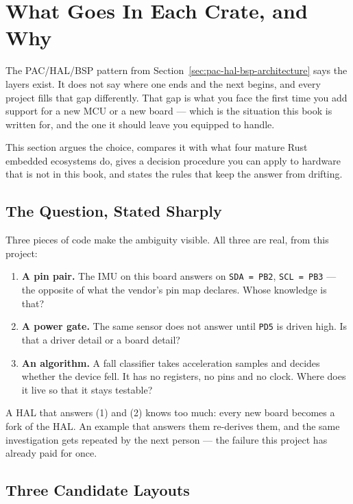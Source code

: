 \section{What Goes In Each Crate, and Why}
\label{sec:what-goes-in-each-crate}

The PAC/HAL/BSP pattern from Section~\ref{sec:pac-hal-bsp-architecture} says the layers exist.
It does not say where one ends and the next begins, and every project fills that gap
differently. That gap is what you face the first time you add support for a new MCU or a new
board — which is the situation this book is written for, and the one it should leave you
equipped to handle.

This section argues the choice, compares it with what four mature Rust embedded ecosystems do,
gives a decision procedure you can apply to hardware that is not in this book, and states the
rules that keep the answer from drifting.

\subsection{The Question, Stated Sharply}

Three pieces of code make the ambiguity visible. All three are real, from this project:

\begin{enumerate}
    \item \textbf{A pin pair.} The IMU on this board answers on \texttt{SDA = PB2},
          \texttt{SCL = PB3} — the opposite of what the vendor's pin map declares. Whose
          knowledge is that?
    \item \textbf{A power gate.} The same sensor does not answer until \texttt{PD5} is driven
          high. Is that a driver detail or a board detail?
    \item \textbf{An algorithm.} A fall classifier takes acceleration samples and decides
          whether the device fell. It has no registers, no pins and no clock. Where does it
          live so that it stays testable?
\end{enumerate}

A HAL that answers (1) and (2) knows too much: every new board becomes a fork of the HAL. An
example that answers them re-derives them, and the same investigation gets repeated by the
next person — the failure this project has already paid for once.

\subsection{Three Candidate Layouts}

